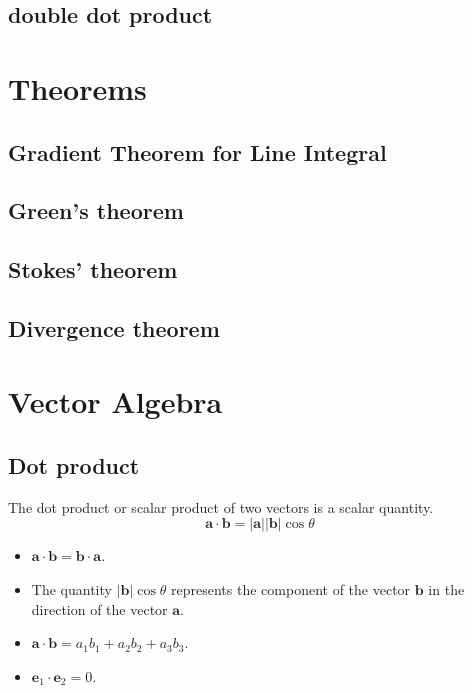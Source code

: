 \subsection{double dot product}

\section{Theorems}
\subsection{Gradient Theorem for Line Integral}

\subsection{Green's theorem}

\subsection{Stokes' theorem}

\subsection{Divergence theorem}





\section{Vector Algebra}
\subsection{Dot product}
The dot product or scalar product of two vectors is a scalar quantity.
\begin{equation}
    \bm{a} \cdot \bm{b} = |\bm{a}| |\bm{b}| \cos \theta
\end{equation}
\begin{itemize}
    \item $ \bm{a}\cdot \bm{b} = \bm{b}\cdot \bm{a} $.
    \item The quantity $|\bm{b}|\cos \theta$ represents the component of the vector $\bm{b}$ in the direction of the vector $\bm{a}$.
    \item $ \bm{a}\cdot \bm{b} = a_1 b_1 + a_2 b_2 + a_3 b_3 $.
    \item $\bm{e}_1 \cdot \bm{e}_2 = 0$. 
\end{itemize}
    
